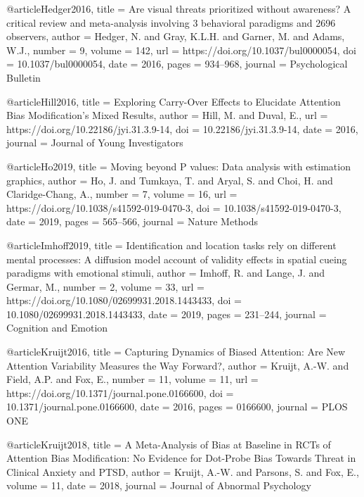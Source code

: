 @article{Hedger2016,
    title       = {Are visual threats prioritized without awareness? A critical review and meta-analysis involving 3 behavioral paradigms and 2696 observers},
    author      = {Hedger, N. and Gray, K.L.H. and Garner, M. and Adams, W.J.},
    number      = {9},
    volume      = {142},
    url         = {https://doi.org/10.1037/bul0000054},
    doi         = {10.1037/bul0000054},
    date        = {2016},
    pages       = {934–968},
    journal     = {Psychological Bulletin}
}


@article{Hill2016,
    title       = {Exploring Carry-Over Effects to Elucidate Attention Bias Modification’s Mixed Results},
    author      = {Hill, M. and Duval, E.},
    url         = {https://doi.org/10.22186/jyi.31.3.9-14},
    doi         = {10.22186/jyi.31.3.9-14},
    date        = {2016},
    journal     = {Journal of Young Investigators}
}


@article{Ho2019,
    title       = {Moving beyond P values: Data analysis with estimation graphics},
    author      = {Ho, J. and Tumkaya, T. and Aryal, S. and Choi, H. and Claridge-Chang, A.},
    number      = {7},
    volume      = {16},
    url         = {https://doi.org/10.1038/s41592-019-0470-3},
    doi         = {10.1038/s41592-019-0470-3},
    date        = {2019},
    pages       = {565–566},
    journal     = {Nature Methods}
}


@article{Imhoff2019,
    title       = {Identification and location tasks rely on different mental processes: A diffusion model account of validity effects in spatial cueing paradigms with emotional stimuli},
    author      = {Imhoff, R. and Lange, J. and Germar, M.},
    number      = {2},
    volume      = {33},
    url         = {https://doi.org/10.1080/02699931.2018.1443433},
    doi         = {10.1080/02699931.2018.1443433},
    date        = {2019},
    pages       = {231–244},
    journal     = {Cognition and Emotion}
}


@article{Kruijt2016,
    title       = {Capturing Dynamics of Biased Attention: Are New Attention Variability Measures the Way Forward?},
    author      = {Kruijt, A.-W. and Field, A.P. and Fox, E.},
    number      = {11},
    volume      = {11},
    url         = {https://doi.org/10.1371/journal.pone.0166600},
    doi         = {10.1371/journal.pone.0166600},
    date        = {2016},
    pages       = {0166600},
    journal     = {PLOS ONE}
}


@article{Kruijt2018,
    title       = {A Meta-Analysis of Bias at Baseline in RCTs of Attention Bias Modification: No Evidence for Dot-Probe Bias Towards Threat in Clinical Anxiety and PTSD},
    author      = {Kruijt, A.-W. and Parsons, S. and Fox, E.},
    volume      = {11},
    date        = {2018},
    journal     = {Journal of Abnormal Psychology}
}


